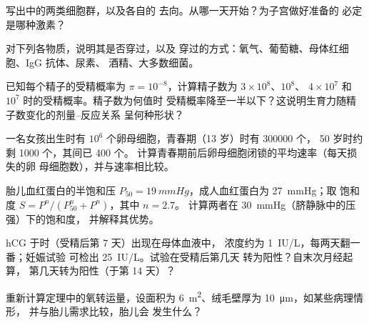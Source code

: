 \begin{exercise}[$\star$]\label{exo:b2:mammal-reproduction:3}
写出中的两类细胞群，以及各自的
去向。从哪一天开始？为子宫做好准备的
必定是哪种激素？
\end{exercise}

\begin{exercise}[$\star$]\label{exo:b2:mammal-reproduction:4}
对下列各物质，说明其是否穿过，以及
穿过的方式：氧气、葡萄糖、母体红细胞、IgG 抗体、尿素、
酒精、大多数细菌。
\end{exercise}

\begin{exercise}[$\star\star$]\label{exo:b2:mammal-reproduction:5}
已知每个精子的受精概率为 $\pi = 10^{-8}$，计算精子数为
$3\times 10^{8}$、$10^{8}$、
$4\times 10^{7}$ 和 $10^{7}$ 时的受精概率。精子数为何值时
受精概率降至一半以下？这说明生育力随精子数变化的剂量–反应关系
呈何种形状？
\end{exercise}

\begin{exercise}[$\star\star$]\label{exo:b2:mammal-reproduction:6}
一名女孩出生时有 $10^{6}$ 个卵母细胞，青春期（13 岁）时有 \num{300000} 个，
50 岁时约剩 \num{1000} 个，其间已 \num{400} 个。
计算青春期前后卵母细胞闭锁的平均速率（每天损失的卵
母细胞数），并与速率相比较。
\end{exercise}

\begin{exercise}[$\star\star$]\label{exo:b2:mammal-reproduction:7}
胎儿血红蛋白的半饱和压 $P_{50} =
\qty{19}{mmHg}$，成人血红蛋白为 \qty{27}{mmHg}；取
饱和度 $S = P^{n}/(P_{50}^{n} + P^{n})$，其中 $n = 2.7$。
计算两者在 \qty{30}{mmHg}（脐静脉中的压强）下的饱和度，
并解释其优势。
\end{exercise}

\begin{exercise}[$\star\star$]\label{exo:b2:mammal-reproduction:8}
hCG 于时（受精后第 7 天）出现在母体血液中，
浓度约为 \qty{1}{IU/L}，每两天翻一番；妊娠试验
可检出 \qty{25}{IU/L}。试验在受精后第几天
转为阳性？自末次月经起算，
第几天转为阳性（于第 14 天）？
\end{exercise}

\begin{exercise}[$\star\star$]\label{exo:b2:mammal-reproduction:9}
重新计算定理中的氧转运量，设面积为
\qty{6}{m^2}、绒毛壁厚为 \qty{10}{\micro m}，如某些病理情形，
并与胎儿需求比较，胎儿会
发生什么？
\end{exercise}

